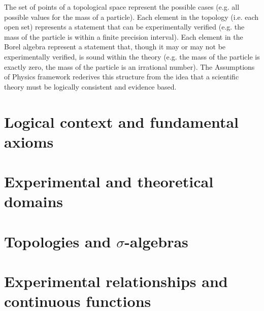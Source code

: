 \documentclass[10pt,twocolumn, nofootinbib]{revtex4-1}
\begin{document}
The set of points of a topological space represent the possible cases (e.g. all possible values for the mass of a particle). Each element in the topology (i.e. each open set) represents a statement that can be experimentally verified (e.g. the mass of the particle is within a finite precision interval). Each element in the Borel algebra represent a statement that, though it may or may not be experimentally verified, is sound within the theory (e.g. the mass of the particle is exactly zero, the mass of the particle is an irrational number). The Assumptions of Physics framework rederives this structure from the idea that a scientific theory must be logically consistent and evidence based.

\section{Logical context and fundamental axioms}

\section{Experimental and theoretical domains}

\section{Topologies and $\sigma$-algebras}

\section{Experimental relationships and continuous functions}


\end{document}
